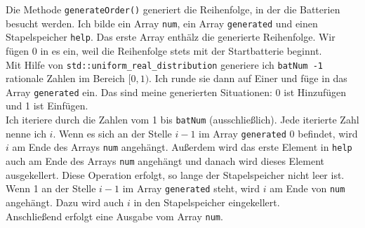 \documentclass[a4paper,10pt,ngerman]{scrartcl}
\begin{document}
Die Methode \texttt{generateOrder()} generiert die Reihenfolge, in der die Batterien besucht werden. Ich bilde ein Array
\texttt{num}, ein Array \texttt{generated} und einen Stapelspeicher \texttt{help}. Das erste Array enthälz die generierte Reihenfolge.
Wir fügen 0 in es ein, weil die Reihenfolge stets mit der Startbatterie beginnt.\\
Mit Hilfe von \texttt{std::uniform\_real\_distribution} generiere ich \texttt{batNum -1} rationale Zahlen im Bereich $[0, 1)$.
Ich runde sie dann auf Einer und füge in das Array \texttt{generated} ein. Das sind meine generierten Situationen: 
0 ist Hinzufügen und 1 ist Einfügen.\\
Ich iteriere durch die Zahlen vom 1 bis \texttt{batNum} (ausschließlich). Jede iterierte Zahl nenne ich $i$.
Wenn es sich an der Stelle $i-1$ im Array \texttt{generated} 0 befindet, wird $i$ am Ende des Arrays \texttt{num} angehängt.
Außerdem wird das erste Element in \texttt{help} auch am Ende des Arrays \texttt{num} angehängt und danach wird dieses Element
ausgekellert. Diese Operation erfolgt, so lange der Stapelspeicher nicht leer ist.\\
Wenn 1 an der Stelle $i-1$ im Array \texttt{generated} steht, wird $i$ am Ende von \texttt{num} angehängt. Dazu wird auch $i$
in den Stapelspeicher eingekellert.\\
Anschließend erfolgt eine Ausgabe vom Array \texttt{num}.\\
\end{document}
